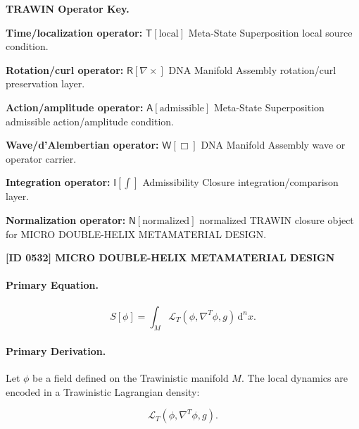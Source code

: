 \par\vspace{0.45\baselineskip}
\noindent\begin{minipage}[t]{\linewidth}
\begingroup
\small
\raggedright
\textbf{TRAWIN Operator Key.}\par
\noindent\textbf{Time/localization operator:} $\mathsf{T}\!\left[\mathrm{local}\right]$ Meta-State Superposition local source condition.\par
\noindent\textbf{Rotation/curl operator:} $\mathsf{R}\!\left[\nabla\times\right]$ DNA Manifold Assembly rotation/curl preservation layer.\par
\noindent\textbf{Action/amplitude operator:} $\mathsf{A}\!\left[\mathrm{admissible}\right]$ Meta-State Superposition admissible action/amplitude condition.\par
\noindent\textbf{Wave/d'Alembertian operator:} $\mathsf{W}\!\left[\Box\right]$ DNA Manifold Assembly wave or operator carrier.\par
\noindent\textbf{Integration operator:} $\mathsf{I}\!\left[\int\right]$ Admissibility Closure integration/comparison layer.\par
\noindent\textbf{Normalization operator:} $\mathsf{N}\!\left[\mathrm{normalized}\right]$ normalized TRAWIN closure object for MICRO DOUBLE-HELIX METAMATERIAL DESIGN.\par
\endgroup
\end{minipage}

\clearpage
\noindent\textbf{[ID 0532] MICRO DOUBLE-HELIX METAMATERIAL DESIGN}\par
\vspace{0.35em}
\paragraph{Primary Equation.}
\begin{equation}
S[\phi]
=
\int_M
\mathcal{L}_T
\left(
\phi,\nabla^T\phi,g
\right)
\,\mathrm{d}^n x .
\end{equation}

\paragraph{Primary Derivation.}
Let $\phi$ be a field defined on the Trawinistic manifold $M$.  
The local dynamics are encoded in a Trawinistic Lagrangian density:

\begin{equation}
\mathcal{L}_T
\left(
\phi,\nabla^T\phi,g
\right).
\end{equation}

